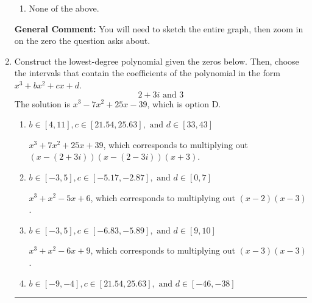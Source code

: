 \documentclass{extbook}[14pt]
\newcommand{\litem}[1]{\item #1

\rule{\textwidth}{0.4pt}}
\begin{document}
\begin{enumerate}
{\begin{enumerate}[label=\Alph*.]
\item None of the above.\end{enumerate}
\textbf{General Comment:} You will need to sketch the entire graph, then zoom in on the zero the question asks about.
}
\litem{
Construct the lowest-degree polynomial given the zeros below. Then, choose the intervals that contain the coefficients of the polynomial in the form $x^3+bx^2+cx+d$.
\[ 2 + 3 i \text{ and } 3 \]The solution is \( x^{3} -7 x^{2} +25 x -39 \), which is option D.\begin{enumerate}[label=\Alph*.]
\item \( b \in [4, 11], c \in [21.54, 25.63], \text{ and } d \in [33, 43] \)

$x^{3} +7 x^{2} +25 x + 39$, which corresponds to multiplying out $(x-(2 + 3 i))(x-(2 - 3 i))(x + 3)$.
\item \( b \in [-3, 5], c \in [-5.17, -2.87], \text{ and } d \in [0, 7] \)

$x^{3} + x^{2} -5 x + 6$, which corresponds to multiplying out $(x -2)(x -3)$.
\item \( b \in [-3, 5], c \in [-6.83, -5.89], \text{ and } d \in [9, 10] \)

$x^{3} + x^{2} -6 x + 9$, which corresponds to multiplying out $(x -3)(x -3)$.
\item \( b \in [-9, -4], c \in [21.54, 25.63], \text{ and } d \in [-46, -38] \)


\end{enumerate}}
\end{enumerate}
\end{document}
